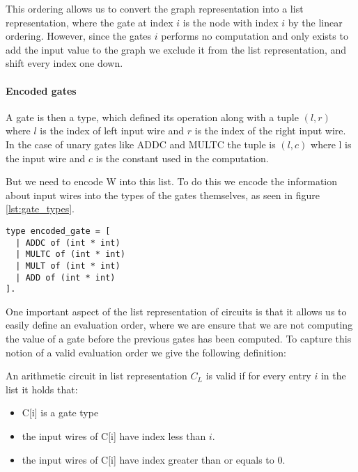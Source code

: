 This ordering allows us to convert the graph representation into a list
representation, where the gate at index $i$ is the node with index $i$ by the
linear ordering. However, since the gates $i$ performs no computation and only
exists to add the input value to the graph we exclude it from the list
representation, and shift every index one down.

\paragraph{Encoded gates}
A gate is then a type, which defined its operation along
with a tuple $(l,r)$ where $l$ is the index of left input wire and $r$ is the
index of the right input wire. In the case of unary gates like ADDC and MULTC
the tuple is $(l, c)$ where l is the input wire and $c$ is the constant used in
the computation.

But we need to encode W into this list. To do this we encode the information
about input wires into the types of the gates themselves, as seen in figure
\ref{lst:gate_types}.

\begin{lstlisting}[float,label=lst:gate_types,caption=Type declaration of gates]
type encoded_gate = [
  | ADDC of (int * int)
  | MULTC of (int * int)
  | MULT of (int * int)
  | ADD of (int * int)
].
\end{lstlisting}
\vspace{2mm}
\noindent
One important aspect of the list representation of circuits is that it allows
us to easily define an evaluation order, where we are ensure that we are not
computing the value of a gate before the previous gates has been computed. To
capture this notion of a valid evaluation order we give the following definition:

\begin{definition}
  \label{def:decomp:valid_circuit}
  An arithmetic circuit in list representation $C_{L}$ is valid if for every
  entry $i$ in the list it holds that:
    \begin{itemize}
      \item C[i] is a gate type
      \item the input wires of C[i] have index less than $i$.
      \item the input wires of C[i] have index greater than or equals to $0$.
    \end{itemize}
\end{definition}

